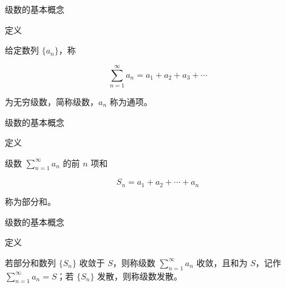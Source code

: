 \documentclass[aspectratio=169,10pt,fontset=fandol]{ctexbeamer}
\newenvironment{custom}[1]{\par\noindent\textbf{#1}\quad}{\par\vspace{0.8em}}
\begin{document}
\begin{frame}[t,fragile]{级数的基本概念}
\normalsize
\begin{block}{定义}
{\normalsize


给定数列 \(\{a_n\}\)，称

\[

\sum_{n=1}^{\infty} a_n = a_1 + a_2 + a_3 + \cdots

\]

为无穷级数，简称级数，\(a_n\) 称为通项。


}
\end{block}
\end{frame}
\begin{frame}[t,fragile]{级数的基本概念}
\normalsize
\begin{block}{定义}
{\normalsize


级数 \(\sum\limits_{n = 1}^{  \infty }  a_n\) 的前 \(n\) 项和

\[

S_n = a_1 + a_2 + \cdots + a_n

\]

称为部分和。


}
\end{block}
\end{frame}
\begin{frame}[t,fragile]{级数的基本概念}
\normalsize
\begin{block}{定义}
{\normalsize


若部分和数列 \(\{S_n\}\) 收敛于 \(S\)，则称级数 \(\sum\limits_{n = 1}^{  \infty } a_n\) 收敛，且和为 \(S\)，记作 \(\sum\limits_{n = 1}^{  \infty } a_n = S\)；若 \(\{S_n\}\) 发散，则称级数发散。


}
\end{block}
\end{frame}
\end{document}
